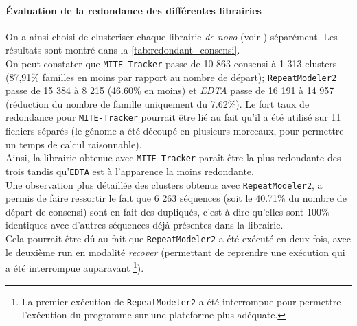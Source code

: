\documentclass[10pt]{article}
\begin{document}
\paragraph{\'Evaluation de la redondance des différentes librairies}\label{par:redondance}
On a ainsi choisi de clusteriser chaque librairie \textit{de novo} (voir ) séparément. Les résultats sont montré dans la \autoref{tab:redondant_consensi}. \\
On peut constater que \texttt{MITE-Tracker} passe de 10 863 consensi à 1 313 clusters (87,91\% familles en moins par rapport au nombre de départ); \texttt{RepeatModeler2} passe de 15 384 à 8 215 (46.60\% en moins) et \textit{EDTA} passe de 16 191 à 14 957 (réduction du nombre de famille uniquement du 7.62\%). Le fort taux de redondance pour \texttt{MITE-Tracker} pourrait être lié au fait qu'il a été utilisé sur 11 fichiers séparés (le génome a été découpé en plusieurs morceaux, pour permettre un temps de calcul raisonnable). \\
Ainsi, la librairie obtenue avec \texttt{MITE-Tracker} paraît être la plus redondante des trois tandis qu'\texttt{EDTA} est à l'apparence la moins redondante. \\
Une observation plus détaillée des clusters obtenus avec  \texttt{RepeatModeler2}, a permis de faire ressortir le fait que 6 263 séquences (soit le 40.71\% du nombre de départ de consensi) sont en fait des dupliqués, c'est-à-dire qu'elles sont 100\% identiques avec d'autres séquences déjà présentes dans la librairie. \\
Cela pourrait être dû au fait que \texttt{RepeatModeler2} a été exécuté en deux fois, avec le deuxième run en modalité \og \textit{recover} \fg{} (permettant de reprendre une exécution qui a été interrompue auparavant \footnote{
La premier exécution de \texttt{RepeatModeler2} a été interrompue pour permettre l'exécution du programme sur une plateforme plus adéquate.
}).


\bigskip
\end{document}
